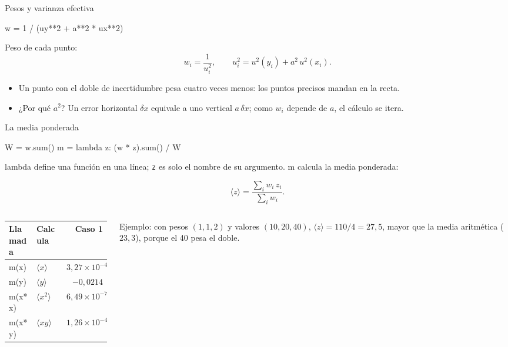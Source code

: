 \documentclass[10pt]{beamer}
\newcommand{\cod}[1]{{\setlength{\fboxsep}{1.4pt}\colorbox{codinline}{\textcolor{codrojo}{\ttfamily\small #1}}}}
\newcommand{\resalta}[1]{\textcolor{structure.fg!75!white}{#1}}
\begin{document}
\begin{frame}[fragile]{Pesos y varianza efectiva}
  \begin{codigo}
w = 1 / (uy**2 + a**2 * ux**2)
  \end{codigo}
  \begin{block}{}
    \resalta{Peso de cada punto:}
    \begin{equation}
      w_i=\frac{1}{u_i^{2}},\qquad u_i^{2}=u^{2}(y_i)+a^{2}\,u^{2}(x_i).
    \end{equation}
  \end{block}
  \begin{itemize}
    \item Un punto con el doble de incertidumbre pesa \resalta{cuatro veces
      menos}: los puntos precisos mandan en la recta.
    \item ¿Por qué $a^{2}$? Un error horizontal $\delta x$ equivale a uno vertical
      $a\,\delta x$; como $w_i$ depende de $a$, el cálculo se \resalta{itera}.
  \end{itemize}
\end{frame}

\begin{frame}[fragile]{La media ponderada}
  \begin{codigo}
W = w.sum()
m = lambda z: (w * z).sum() / W
  \end{codigo}
  \cod{lambda} define una función en una línea; \texttt{z} es solo el nombre de
  su argumento. \cod{m} calcula la \resalta{media ponderada}:
  \begin{block}{}
    \begin{equation}
      \langle z\rangle=\frac{\sum_i w_i\,z_i}{\sum_i w_i}.
    \end{equation}
  \end{block}
  \begin{columns}[T]
    \begin{column}{0.5\textwidth}
      \centering\small
      \begin{tabular}{@{}llr@{}}
        \toprule
        Llamada & Calcula & Caso 1\\
        \midrule
        \cod{m(x)} & $\langle x\rangle$ & $3{,}27\times10^{-4}$\\
        \cod{m(y)} & $\langle y\rangle$ & $-0{,}0214$\\
        \cod{m(x*x)} & $\langle x^{2}\rangle$ & $6{,}49\times10^{-7}$\\
        \cod{m(x*y)} & $\langle xy\rangle$ & $1{,}26\times10^{-4}$\\
        \bottomrule
      \end{tabular}
    \end{column}
    \begin{column}{0.46\textwidth}
      \small Ejemplo: con pesos $(1,1,2)$ y valores $(10,20,40)$,
      $\langle z\rangle=110/4=27{,}5$, mayor que la media aritmética
      ($23{,}3$), porque el 40 pesa el doble.
    \end{column}
  \end{columns}
\end{frame}
\end{document}
